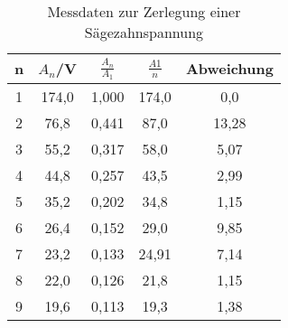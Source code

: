 
\begin{table}[h!]
  \centering
  \caption{Messdaten zur Zerlegung einer Sägezahnspannung}
  \label{tab:sägezahn}
  \begin{tabular}{c c c c c}
    \toprule
n & $A_n$/V & $\frac{A_{n}}{A_{1}}$ & $\frac{A1}{n}$ & Abweichung\\
    \midrule

    1 & 174,0 & 1,000          & 174,0  & 0,0  \\
    2 & 76,8  & 0,441  & 87,0   & 13,28  \\
    3 & 55,2  & 0,317  & 58,0   & 5,07 \\
    4 & 44,8  & 0,257  & 43,5	 & 2,99  \\
    5 & 35,2  & 0,202  & 34,8	 & 1,15  \\
    6 & 26,4  & 0,152  & 29,0   & 9,85 \\
    7 & 23,2  & 0,133  & 24,91  & 7,14 \\
    8 & 22,0  & 0,126  & 21,8	 & 1,15  \\
    9 & 19,6  & 0,113  & 19,3	 & 1,38  \\












    \bottomrule
  \end{tabular}
\end{table}
